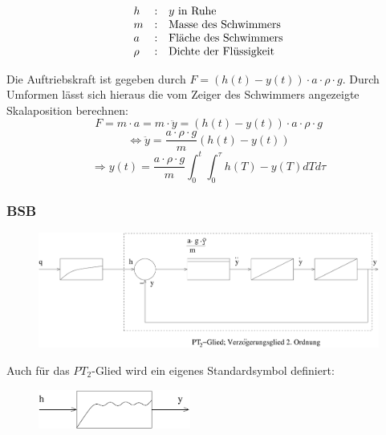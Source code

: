 \documentclass[12pt,a4paper,ngerman]{scrartcl}
\begin{document}
\begin{minipage}{.6\linewidth}
\begin{align*}
\begin{array}{lll}
h&:& y $ in Ruhe$\\
m&:& $Masse des Schwimmers$\\
a&:& $Fläche des Schwimmers$\\
\rho&:& $Dichte der Flüssigkeit$\\
\end{array}
\end{align*}
\end{minipage}
Die Auftriebskraft ist gegeben durch $F= (h(t)-y(t))\cdot a \cdot \rho \cdot g$. Durch Umformen lässt sich hieraus die vom Zeiger des Schwimmers angezeigte Skalaposition berechnen:
\begin{equation*}
  F=m \cdot a = m \cdot \ddot{y}=(h(t)-y(t))\cdot a \cdot \rho \cdot g
\end{equation*}
\begin{equation*}
  \Leftrightarrow \ddot{y}= \frac{a \cdot \rho \cdot g}{m}(h(t)-y(t))
\end{equation*}
\begin{equation*}
  \Rightarrow y(t) = \frac{a \cdot \rho \cdot g}{m}\int_0^t{\int_0^\tau{h(T)-y(T)dT}d\tau}
\end{equation*}

\subsubsection*{BSB}

\begin{figure}[H]
  \centering
\includegraphics[width=.8\linewidth]{sysregel_bsb5}  
\end{figure}

Auch für das $PT_2$-Glied wird ein eigenes Standardsymbol definiert:
\begin{figure}[H]
\includegraphics[width=5cm]{sysregel_pt2}
  
\end{figure}
\end{document}
